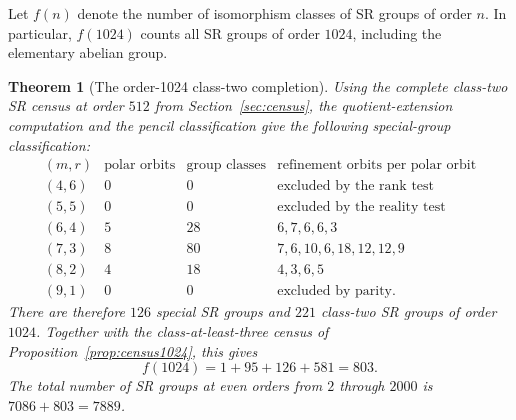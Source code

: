 \documentclass[11pt,a4paper]{amsart}
\newtheorem{thm}{Theorem}[section]
\theoremstyle{definition}
\theoremstyle{remark}
\numberwithin{equation}{section}
\begin{document}
Let $f(n)$ denote the number of isomorphism classes of SR groups of
order $n$. In particular, $f(1024)$ counts all SR groups of order
$1024$, including the elementary abelian group.

\begin{thm}[The order-1024 class-two completion]\label{thm:class2-complete}
Using the complete class-two SR census at order $512$ from
Section~\ref{sec:census}, the quotient-extension computation and the
pencil classification give the following special-group classification:
\[
\begin{array}{c|r|r|l}
(m,r)&\text{polar orbits}&\text{group classes}&
 \text{refinement orbits per polar orbit}\\\hline
(4,6)&0&0&\text{excluded by the rank test}\\
(5,5)&0&0&\text{excluded by the reality test}\\
(6,4)&5&28&6,7,6,6,3\\
(7,3)&8&80&7,6,10,6,18,12,12,9\\
(8,2)&4&18&4,3,6,5\\
(9,1)&0&0&\text{excluded by parity}.
\end{array}
\]
There are therefore $126$ special SR groups and $221$ class-two SR
groups of order $1024$. Together with the class-at-least-three census
of Proposition~\ref{prop:census1024}, this gives
\[
 \boxed{f(1024)=1+95+126+581=803.}
\]
The total number of SR groups at even orders from $2$ through $2000$
is $7086+803=7889$.
\end{thm}
\end{document}
